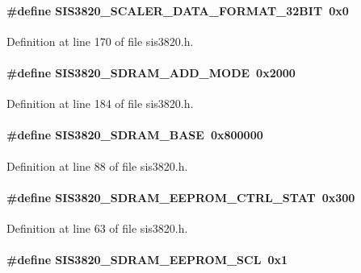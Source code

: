 \paragraph[{SIS3820\_\-SCALER\_\-DATA\_\-FORMAT\_\-32BIT}]{\setlength{\rightskip}{0pt plus 5cm}\#define SIS3820\_\-SCALER\_\-DATA\_\-FORMAT\_\-32BIT~0x0}\hfill\label{sis3820_8h_acfc52d75f208d09034914ba55f88726f}


Definition at line 170 of file sis3820.h.
\paragraph[{SIS3820\_\-SDRAM\_\-ADD\_\-MODE}]{\setlength{\rightskip}{0pt plus 5cm}\#define SIS3820\_\-SDRAM\_\-ADD\_\-MODE~0x2000}\hfill\label{sis3820_8h_a7658669aed44c420d0a2a3cd6ef6287f}


Definition at line 184 of file sis3820.h.
\paragraph[{SIS3820\_\-SDRAM\_\-BASE}]{\setlength{\rightskip}{0pt plus 5cm}\#define SIS3820\_\-SDRAM\_\-BASE~0x800000}\hfill\label{sis3820_8h_a34ecf92c13926260c9b99052c65ce44b}


Definition at line 88 of file sis3820.h.
\paragraph[{SIS3820\_\-SDRAM\_\-EEPROM\_\-CTRL\_\-STAT}]{\setlength{\rightskip}{0pt plus 5cm}\#define SIS3820\_\-SDRAM\_\-EEPROM\_\-CTRL\_\-STAT~0x300}\hfill\label{sis3820_8h_a63908cfd0c897722ae9c6314db2db8d9}


Definition at line 63 of file sis3820.h.
\paragraph[{SIS3820\_\-SDRAM\_\-EEPROM\_\-SCL}]{\setlength{\rightskip}{0pt plus 5cm}\#define SIS3820\_\-SDRAM\_\-EEPROM\_\-SCL~0x1}\hfill\label{sis3820_8h_a26cf16a22681f68943dc7038350579c1}


